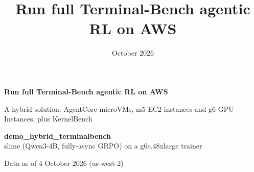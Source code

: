
\renewcommand{\deckfooter}{demo\_hybrid\_terminalbench $\cdot$ agentcore-project $\cdot$ October 2026}

\title{Run full Terminal-Bench agentic RL on AWS}
\date{October 2026}



{
\begin{frame}[plain]
\vspace*{4mm}
\begin{minipage}{0.60\textwidth}\raggedright
{\fontsize{22}{26}\selectfont\bfseries\color{white}Run full Terminal-Bench agentic RL on AWS\par}
\vspace{3mm}
{\raggedright\large\color{white}A hybrid solution: AgentCore microVMs, m5 EC2 instances and g6 GPU Instances, plus KernelBench\par}
\vspace{8mm}
{\small\color{white}\textbf{demo\_hybrid\_terminalbench}\\slime (Qwen3-4B, fully-async GRPO) on a g6e.48xlarge trainer\par}
\vspace{3mm}
{\scriptsize\color{inkmuted}Data as of 4 October 2026 (us-west-2)}
\end{minipage}
\end{frame}}

